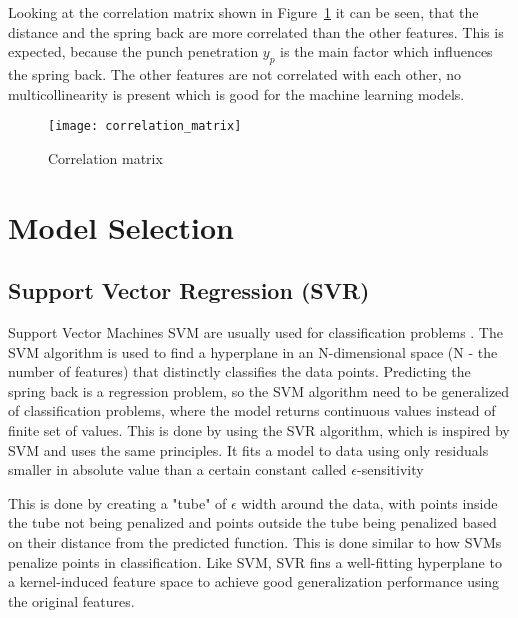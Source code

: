 Looking at the correlation matrix shown in
Figure~\ref*{fig:correlation_matrix} it can be seen,
that the distance and
the spring back are more correlated than the other features. This is
expected, because the punch
penetration $y_p$ is
the main factor which influences the spring back. The other features are not
correlated with each
other, no
multicollinearity is present which is good for the machine learning models.

\begin{figure}[H]
    \begin{tcolorbox}[arc=0pt,boxrule=0.5pt]
        \centering
        \texttt{[image: correlation\_matrix]}
        \caption{Correlation matrix}
        \label{fig:correlation_matrix}
    \end{tcolorbox}
\end{figure}


\section{Model Selection}\label{sec:model-selection}

\subsection{Support Vector Regression (SVR)
}\label{subsec:support-vector-regression-(svr)}
Support Vector Machines \ac{SVM} are usually used for classification problems
. The \ac{SVM}
algorithm is used to find
a hyperplane in an N-dimensional space (N - the number of features) that
distinctly classifies
the data points.
\cite[p. 42]{awad_efficientlearningmachines_2015}
Predicting the spring back is a regression problem, so the \ac{SVM} algorithm
need to be
generalized of
classification problems, where the model returns continuous values instead of
finite set of values.
This is done by using the \ac{SVR} algorithm, which is inspired by  \ac{SVM}
and uses the same
principles.
It fits a model to data using only residuals smaller in absolute value than a
certain constant
called
$\epsilon$-sensitivity

This is done by creating a "tube" of $\epsilon$ width around the data, with
points inside the
tube not being
penalized and points outside the tube being penalized based on their distance
from the predicted
function.
This is done similar to how \ac{SVM}s penalize points in classification.
Like \ac{SVM}, \ac{SVR} fins a well-fitting hyperplane to a kernel-induced
feature space to
achieve good
generalization performance using the original features.
\cite[p. 369]{montesinoslopez_supportvectormachines_2022}

